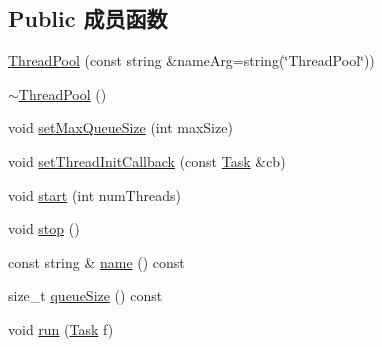 \subsection*{Public 成员函数}
\begin{DoxyCompactItemize}
\item 
\hyperlink{classmuduo_1_1ThreadPool_a21b4ca4f3a0f24ebc259c032fcaac7b2}{Thread\+Pool} (const string \&name\+Arg=string(\char`\"{}Thread\+Pool\char`\"{}))
\item 
\hyperlink{classmuduo_1_1ThreadPool_ad41a30b11a0c9d8566ca1a53b4cf43f6}{$\sim$\+Thread\+Pool} ()
\item 
void \hyperlink{classmuduo_1_1ThreadPool_a56a75ef71bd9fd9c5a42942cf327a0a6}{set\+Max\+Queue\+Size} (int max\+Size)
\item 
void \hyperlink{classmuduo_1_1ThreadPool_a4e2a4c84ffbb1dddd012ee464aa75007}{set\+Thread\+Init\+Callback} (const \hyperlink{classmuduo_1_1ThreadPool_a46c264006febdf6c5dae5921d59c18d2}{Task} \&cb)
\item 
void \hyperlink{classmuduo_1_1ThreadPool_a8fd9dd10347539b445bb28ce204d0c2d}{start} (int num\+Threads)
\item 
void \hyperlink{classmuduo_1_1ThreadPool_a8c528baf37154d347366083f0f816846}{stop} ()
\item 
const string \& \hyperlink{classmuduo_1_1ThreadPool_a47f4f0a66d5a539e687100dc65462ced}{name} () const
\item 
size\+\_\+t \hyperlink{classmuduo_1_1ThreadPool_a0eff42734d64323acbd2e676bcd27b76}{queue\+Size} () const
\item 
void \hyperlink{classmuduo_1_1ThreadPool_a47954c90f031defe912d2acc4d9f7b2f}{run} (\hyperlink{classmuduo_1_1ThreadPool_a46c264006febdf6c5dae5921d59c18d2}{Task} f)
\end{DoxyCompactItemize}

